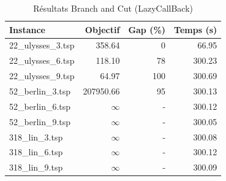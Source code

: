 \begin{table}[H]
\centering
\caption{Résultats Branch and Cut (LazyCallBack)}
\small
\begin{tabular}{|l|r|r|r|}
\hline
\textbf{Instance} & \textbf{Objectif} & \textbf{Gap (\%)} & \textbf{Temps (s)} \\
\hline
22\_ulysses\_3.tsp & 358.64 & 0 & 66.95 \\
22\_ulysses\_6.tsp & 118.10 & 78 & 300.23 \\
22\_ulysses\_9.tsp & 64.97 & 100 & 300.69 \\
52\_berlin\_3.tsp & 207950.66 & 95 & 300.13 \\
52\_berlin\_6.tsp & $\infty$ & - & 300.12 \\
52\_berlin\_9.tsp & $\infty$ & - & 300.05 \\
318\_lin\_3.tsp & $\infty$ & - & 300.08 \\
318\_lin\_6.tsp & $\infty$ & - & 300.12 \\
318\_lin\_9.tsp & $\infty$ & - & 300.09 \\
\hline
\end{tabular}
\end{table}
